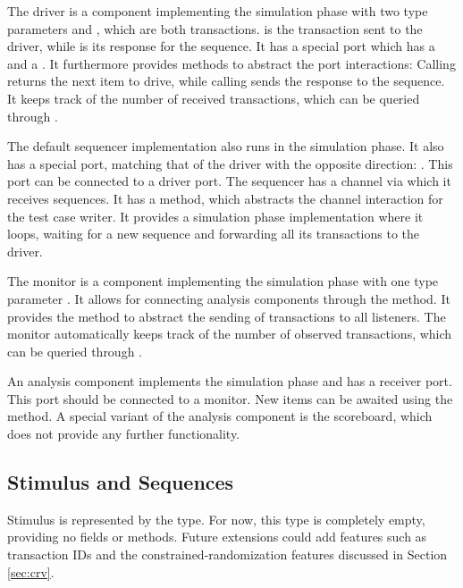 The driver is a component implementing the simulation phase with two type parameters  and , which are
both transactions.  is the transaction sent to the driver, while  is its response for the
sequence. It has a special port  which has a  and a . It
furthermore provides methods to abstract the port interactions: Calling  returns the next item to drive,
while calling  sends the response to the sequence. It keeps track of the number of received
transactions, which can be queried through .

The default sequencer implementation also runs in the simulation phase. It also has a special port, matching that of
the driver with the opposite direction: . This port can be connected to a driver port. The
sequencer has a channel via which it receives sequences. It has a  method, which
abstracts the channel interaction for the test case writer. It provides a simulation phase implementation where it
loops, waiting for a new sequence and forwarding all its transactions to the driver.

The monitor is a component implementing the simulation phase with one type parameter . It allows for
connecting analysis components through the  method. It provides the
 method to abstract the sending of transactions to all listeners. The monitor automatically keeps
track of the number of observed transactions, which can be queried through .

An analysis component implements the simulation phase and has a receiver port. This port should be connected to a
monitor. New items can be awaited using the  method. A special variant of the analysis component is the
scoreboard, which does not provide any further functionality.

\subsection{Stimulus and Sequences} %

Stimulus is represented by the  type. For now, this type is completely empty, providing no fields or
methods. Future extensions could add features such as transaction IDs and the constrained-randomization features
discussed in Section \ref{sec:crv}.

